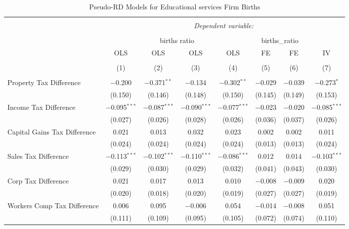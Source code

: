 
\begin{table}[!htbp] \centering 
  \caption{Pseudo-RD Models for  Educational services Firm Births} 
  \label{} 
\begin{tabular}{@{\extracolsep{5pt}}lccccccc} 
\\[-1.8ex]\hline 
\hline \\[-1.8ex] 
 & \multicolumn{7}{c}{\textit{Dependent variable:}} \\ 
\cline{2-8} 
\\[-1.8ex] & \multicolumn{4}{c}{births ratio} & \multicolumn{2}{c}{births\_ratio} &   \\ 
 & OLS & OLS & OLS & OLS & FE & FE & IV \\ 
\\[-1.8ex] & (1) & (2) & (3) & (4) & (5) & (6) & (7)\\ 
\hline \\[-1.8ex] 
 Property Tax Difference & $-$0.200 & $-$0.371$^{**}$ & $-$0.134 & $-$0.302$^{**}$ & $-$0.029 & $-$0.039 & $-$0.273$^{*}$ \\ 
  & (0.150) & (0.146) & (0.148) & (0.150) & (0.145) & (0.149) & (0.153) \\ 
  Income Tax Difference & $-$0.095$^{***}$ & $-$0.087$^{***}$ & $-$0.090$^{***}$ & $-$0.077$^{***}$ & $-$0.023 & $-$0.020 & $-$0.085$^{***}$ \\ 
  & (0.027) & (0.026) & (0.028) & (0.026) & (0.036) & (0.037) & (0.026) \\ 
  Capital Gains Tax Difference & 0.021 & 0.013 & 0.032 & 0.023 & 0.002 & 0.002 & 0.011 \\ 
  & (0.024) & (0.024) & (0.024) & (0.024) & (0.013) & (0.013) & (0.024) \\ 
  Sales Tax Difference & $-$0.113$^{***}$ & $-$0.102$^{***}$ & $-$0.110$^{***}$ & $-$0.086$^{***}$ & 0.012 & 0.014 & $-$0.103$^{***}$ \\ 
  & (0.029) & (0.030) & (0.029) & (0.032) & (0.041) & (0.043) & (0.030) \\ 
  Corp Tax Difference & 0.021 & 0.017 & 0.013 & 0.010 & $-$0.008 & $-$0.009 & 0.020 \\ 
  & (0.020) & (0.018) & (0.020) & (0.019) & (0.027) & (0.027) & (0.019) \\ 
  Workers Comp Tax Difference & 0.006 & 0.095 & $-$0.006 & 0.054 & $-$0.014 & $-$0.008 & 0.051 \\ 
  & (0.111) & (0.109) & (0.095) & (0.105) & (0.072) & (0.074) & (0.110) \\ 

\end{tabular}
\end{table}

